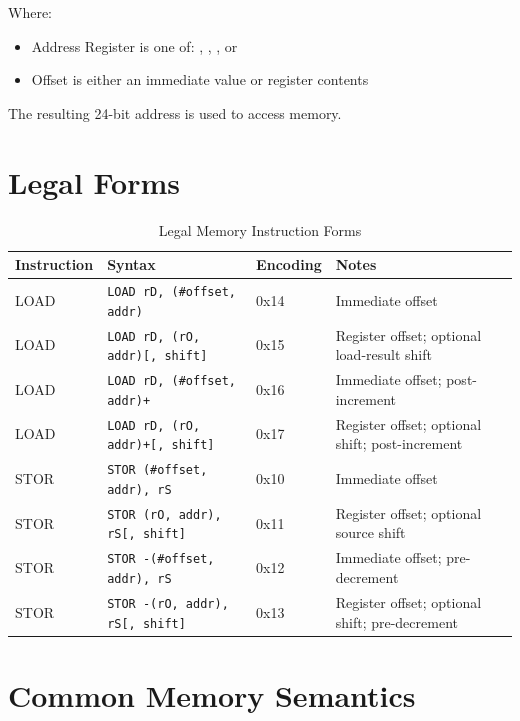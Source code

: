 Where:
\begin{itemize}
	\item Address Register is one of: , , , or 
	\item Offset is either an immediate value or register contents
\end{itemize}

The resulting 24-bit address is used to access memory.

\section{Legal Forms}

\begin{table}[H]
	\centering
	\small
	\begin{tabular}{llll}
		\toprule
		\textbf{Instruction} & \textbf{Syntax} & \textbf{Encoding} & \textbf{Notes} \\
		\midrule
		LOAD & \texttt{LOAD rD, (\#offset, addr)} & 0x14 & Immediate offset \\
		LOAD & \texttt{LOAD rD, (rO, addr)[, shift]} & 0x15 & Register offset; optional load-result shift \\
		LOAD & \texttt{LOAD rD, (\#offset, addr)+} & 0x16 & Immediate offset; post-increment \\
		LOAD & \texttt{LOAD rD, (rO, addr)+[, shift]} & 0x17 & Register offset; optional shift; post-increment \\
		STOR & \texttt{STOR (\#offset, addr), rS} & 0x10 & Immediate offset \\
		STOR & \texttt{STOR (rO, addr), rS[, shift]} & 0x11 & Register offset; optional source shift \\
		STOR & \texttt{STOR -(\#offset, addr), rS} & 0x12 & Immediate offset; pre-decrement \\
		STOR & \texttt{STOR -(rO, addr), rS[, shift]} & 0x13 & Register offset; optional shift; pre-decrement \\
		\bottomrule
	\end{tabular}
	\caption{Legal Memory Instruction Forms}
	\label{tab:memory-legal-forms}
\end{table}

\section{Common Memory Semantics}

